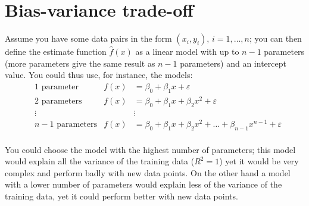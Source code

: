   \section{Bias-variance trade-off}

    Assume you have some data pairs in the form $(x_i, y_i), \, i = 1, \dots,
    n$; you can then define the estimate function $\hat{f}(x)$ as a linear model
    with up to $n-1$ parameters (more parameters give the same result as $n-1$
    parameters) and an intercept value. You could thus use, for instance, the
    models:
    \begin{align*}
      & 1 \text{ parameter}    &f(x) &= \beta_0 + \beta_1x + \varepsilon \\
      & 2 \text{ parameters}   &f(x) &= \beta_0 + \beta_1x + \beta_2x^2 + \varepsilon \\
      & \vdots                 &     &\vdots \\
      & n-1 \text{ parameters} &f(x) &= \beta_0 + \beta_1x + \beta_2x^2 + \dots + \beta_{n-1}x^{n-1} + \varepsilon \\
    \end{align*}

    You could choose the model with the highest number of parameters; this model
    would explain all the variance of the training data ($R^2=1$) yet it would
    be very complex and perform badly with new data points. On the other hand a
    model with a lower number of parameters would explain less of the variance
    of the training data, yet it could perform better with new data points. \\\\

